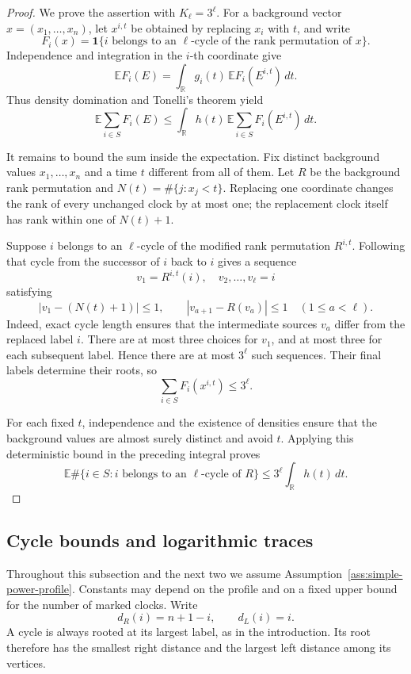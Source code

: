 \documentclass[11pt]{article}
\theoremstyle{remark}
\theoremstyle{plain}
\newcommand{\E}{\mathbb E}
\newcommand{\one}{\mathbf 1}
\begin{document}
\begin{proof}
We prove the assertion with $K_\ell=3^\ell$.  For a background vector
$x=(x_1,\ldots,x_n)$, let $x^{i,t}$ be obtained by replacing $x_i$ with
$t$, and write
\[
 F_i(x)=\one\{i\text{ belongs to an }\ell\text{-cycle of the rank
 permutation of }x\}.
\]
Independence and integration in the $i$-th coordinate give
\[
 \E F_i(E)=\int_{\mathbb R}g_i(t)\,\E F_i(E^{i,t})\,dt.
\]
Thus density domination and Tonelli's theorem yield
\[
 \E\sum_{i\in S}F_i(E)
 \le\int_{\mathbb R}h(t)\,
       \E\sum_{i\in S}F_i(E^{i,t})\,dt.
\]

It remains to bound the sum inside the expectation.  Fix distinct
background values $x_1,\ldots,x_n$ and a time $t$ different from all of
them.  Let $R$ be the background rank permutation and
$N(t)=\#\{j:x_j<t\}$.  Replacing one coordinate changes the rank of
every unchanged clock by at most one; the replacement clock itself has
rank within one of $N(t)+1$.

Suppose $i$ belongs to an $\ell$-cycle of the modified rank permutation
$R^{i,t}$.  Following that cycle from the successor of $i$ back to $i$
gives a sequence
\[
 v_1=R^{i,t}(i),\quad v_2,\ldots,v_\ell=i
\]
satisfying
\[
 |v_1-(N(t)+1)|\le1,\qquad
 |v_{a+1}-R(v_a)|\le1\quad(1\le a<\ell).
\]
Indeed, exact cycle length ensures that the intermediate sources $v_a$
differ from the replaced label $i$.  There are at most three choices
for $v_1$, and at most three for each subsequent label.  Hence there
are at most $3^\ell$ such sequences.  Their final labels determine
their roots, so
\[
 \sum_{i\in S}F_i(x^{i,t})\le3^\ell.
\]

For each fixed $t$, independence and the existence of densities ensure
that the background values are almost surely distinct and avoid $t$.
Applying this deterministic bound in the preceding integral proves
\[
 \E\#\{i\in S:i\text{ belongs to an }\ell\text{-cycle of }R\}
 \le3^\ell\int_{\mathbb R}h(t)\,dt.
\]
\end{proof}


\subsection{Cycle bounds and logarithmic traces}
\label{subsec:sp-cycle-traces}

Throughout this subsection and the next two we assume
Assumption~\ref{ass:simple-power-profile}.  Constants may depend on the
profile and on a fixed upper bound for the number of marked clocks.  Write
\[
 d_R(i)=n+1-i,\qquad d_L(i)=i.
\]
A cycle is always rooted at its largest label, as in the introduction.
Its root therefore has the smallest right distance and the largest left
distance among its vertices.
\end{document}
